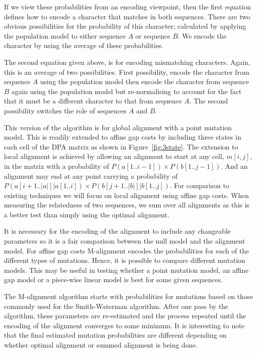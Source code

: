 \documentclass[a4paper,11pt,oneside]{article}
\begin{document}
If we view these probabilities from an encoding viewpoint, then the first
equation defines how to encode a character that matches in both sequences.
There are two obvious possibilities for the probability of this character;
calculated by applying the population model to either sequence $A$ or sequence
$B$.  We encode the character by using the average of these probabilities.

The second equation given above, is for encoding mismatching characters.
Again, this is an average of two possibilities.  First possibility, encode the
character from sequence $A$ using the population model then encode the
character from sequence $B$ again using the population model but
re-normalising to account for the fact that it must be a different character
to that from sequence $A$.  The second possibility switches the role of
sequences $A$ and $B$.

This version of the algorithm is for global alignment with a point mutation
model.  This is readily extended to affine gap costs by including three states
in each cell of the DPA matrix as shown in Figure~\ref{fig:3state}.  The
extension to local alignment is achieved by allowing an alignment to start at
any cell, $m[i,j]$, in the matrix with a probability of $P(a[1..i-1]) \times
P(b[1..j-1])$.  And an alignment may end at any point carrying a probability
of $P(a[i+1..|a|] | a[1..i]) \times P(b[j+1..|b|] | b[1..j])$.  For comparison
to existing techniques we will focus on local alignment using affine gap
costs.  When measuring the relatedness of two sequences, we sum over all
alignments as this is a better test than simply using the optimal alignment.

It is necessary for the encoding of the alignment to include any changeable
parameters so it is a fair comparison between the null model and the alignment
model.  For affine gap costs M-alignment encodes the probabilities for each of
the different types of mutations.  Hence, it is possible to compare different
mutation models.  This may be useful in testing whether a point mutation
model, an affine gap model or a piece-wise linear model is best for some given
sequences.

The M-alignment algorithm starts with probabilities for mutations based on
those commonly used for the Smith-Waterman algorithm.  After one pass by the
algorithm, these parameters are re-estimated and the process repeated until
the encoding of the alignment converges to some minimum.  It is interesting to
note that the final estimated mutation probabilities are different depending
on whether optimal alignment or summed alignment is being done.
\end{document}
